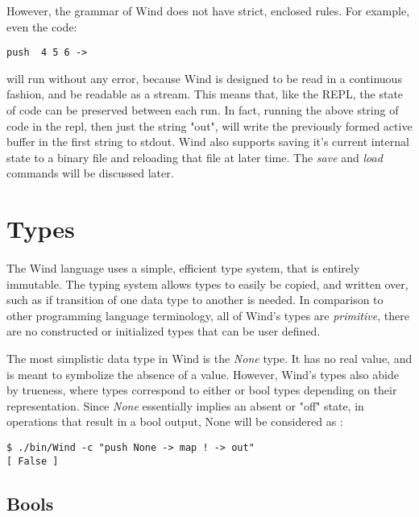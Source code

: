 \par However, the grammar of Wind does not have strict, enclosed rules. For example, even the code: \\

\begin{verbatim}
push  4 5 6 ->
\end{verbatim}

will run without any error, because Wind is designed to be read in a continuous fashion, and be readable as a stream. This means that, like the REPL, the state of code can be preserved between each run.  In fact, running the above string of code in the repl, then just the string "out", will write the previously formed active buffer in the first string to stdout. Wind also supports saving it's current internal state to a binary file and reloading that file at later time. The \emph{save} and \emph{load} commands will be discussed later.

\section{Types}

\paragraph{  } The Wind language uses a simple, efficient type system, that is entirely immutable. The typing system allows types to easily be copied, and written over, such as if transition of one data type to another is needed. In comparison to other programming language terminology, all of Wind's types are \emph{primitive}, there are no constructed or initialized types that can be user defined.
\par The most simplistic data type in Wind is the \emph{None} type. It has no real value, and is meant to symbolize the absence of a value.  However, Wind's types also abide by trueness, where types correspond to either  or  bool types depending on their representation. Since \emph{None} essentially implies an absent or "off" state, in operations that result in a bool output, None will be considered as :

\begin{verbatim}
$ ./bin/Wind -c "push None -> map ! -> out"
[ False ]
\end{verbatim}

\subsection{Bools}


